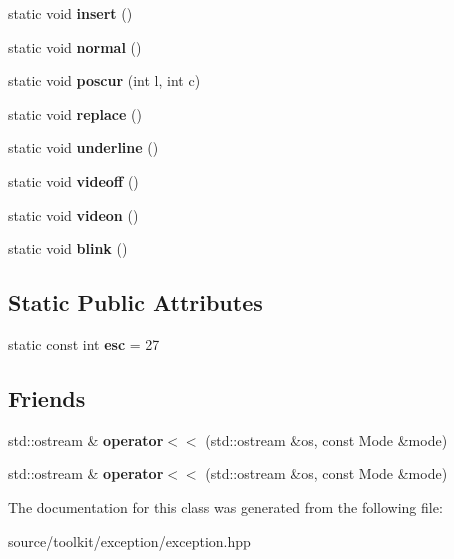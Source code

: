 \begin{DoxyCompactItemize}
static void {\bfseries insert} ()
\item 
\mbox{\label{classConsole_a0af50381e547a4ad90b0fc5d82d3d9c0}} 
static void {\bfseries normal} ()
\item 
\mbox{\label{classConsole_a00f6a2d90f6788226f7640fbdc399be9}} 
static void {\bfseries poscur} (int l, int c)
\item 
\mbox{\label{classConsole_a8bbc999f5c03ee649261f395113f3327}} 
static void {\bfseries replace} ()
\item 
\mbox{\label{classConsole_acdbffad9e6d5faf3654f2f662a885c05}} 
static void {\bfseries underline} ()
\item 
\mbox{\label{classConsole_a0c0b82ca8465e8d07d1c1000fd1c7065}} 
static void {\bfseries videoff} ()
\item 
\mbox{\label{classConsole_a9452e745b8255bfc5c01914e284a6dde}} 
static void {\bfseries videon} ()
\item 
\mbox{\label{classConsole_a0d4128ee5041ea69f58cbb0d200a2f80}} 
static void {\bfseries blink} ()
\end{DoxyCompactItemize}
\subsection*{Static Public Attributes}
\begin{DoxyCompactItemize}
\item 
\mbox{\label{classConsole_a721882a4c285d845c1adabbda2199d66}} 
static const int {\bfseries esc} = 27
\end{DoxyCompactItemize}
\subsection*{Friends}
\begin{DoxyCompactItemize}
\item 
\mbox{\label{classConsole_aff1b0921f7ab18e456bfb58711afdaea}} 
std\+::ostream \& {\bfseries operator$<$$<$} (std\+::ostream \&os, const Mode \&mode)
\item 
\mbox{\label{classConsole_aff1b0921f7ab18e456bfb58711afdaea}} 
std\+::ostream \& {\bfseries operator$<$$<$} (std\+::ostream \&os, const Mode \&mode)
\end{DoxyCompactItemize}


The documentation for this class was generated from the following file\+:\begin{DoxyCompactItemize}
\item 
source/toolkit/exception/exception.\+hpp\end{DoxyCompactItemize}
